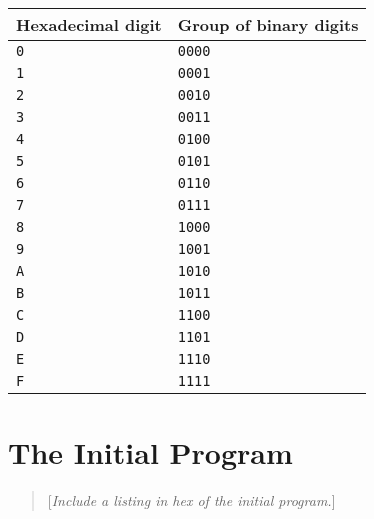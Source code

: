 \documentclass[a4paper,12pt]{article}
\newcommand{\num}[1]{\texttt{#1}\xspace}
\newcommand{\comment}[1]{\begin{quote}[\textit{#1}]\end{quote}}
\begin{document}
\begin{center}
  \begin{tabular}{@{}ll@{}}
    \hline
    Hexadecimal digit & Group of binary digits \\
    \hline
    \num{0}           & \num{0000}   \\
    \num{1}           & \num{0001}   \\
    \num{2}           & \num{0010}   \\
    \num{3}           & \num{0011}   \\
    \num{4}           & \num{0100}   \\
    \num{5}           & \num{0101}   \\
    \num{6}           & \num{0110}   \\
    \num{7}           & \num{0111}   \\
    \num{8}           & \num{1000}   \\
    \num{9}           & \num{1001}   \\
    \num{A}           & \num{1010}   \\
    \num{B}           & \num{1011}   \\
    \num{C}           & \num{1100}   \\
    \num{D}           & \num{1101}   \\
    \num{E}           & \num{1110}   \\
    \num{F}           & \num{1111}   \\
    \hline
  \end{tabular}
\end{center}

\section{The Initial Program}
\label{sec:initial-program}

\comment{Include a listing in hex of the initial program.}
\end{document}
